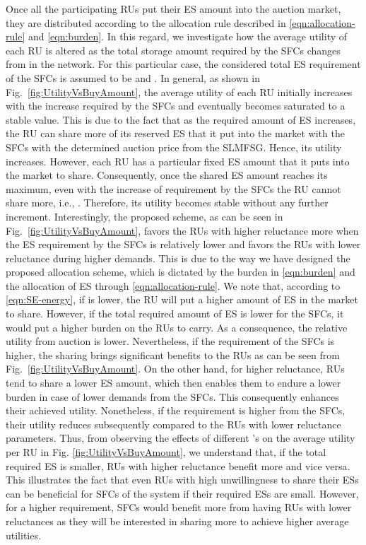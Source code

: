 \documentclass[journal,10pt]{IEEEtran}
\begin{document}
Once all the participating RUs put their ES amount into the auction market, they are distributed according to the allocation rule described in \eqref{eqn:allocation-rule} and \eqref{eqn:burden}. In this regard, we investigate how the average utility of each RU is altered as the total storage amount required by the SFCs changes from in the network. For this particular case, the considered total ES requirement of the SFCs is assumed to be  and . In general, as shown in Fig.~\ref{fig:UtilityVsBuyAmount}, the average utility of each RU initially increases with the increase required by the SFCs and eventually becomes saturated to a stable value. This is due to the fact that as the required amount of ES increases, the RU can share more of its reserved ES that it put into the market with the SFCs with the determined auction price from the SLMFSG. Hence, its utility increases. However, each RU has a particular fixed ES amount that it puts into the market to share. Consequently, once the shared  ES amount reaches its maximum, even with the increase of requirement by the SFCs the RU cannot share more, i.e., . Therefore, its utility becomes stable without any further increment. Interestingly, the proposed scheme, as can be seen in Fig.~\ref{fig:UtilityVsBuyAmount}, favors the RUs with higher reluctance more when the ES requirement by the SFCs is relatively lower and favors the RUs with lower reluctance during higher demands. This is due to the way we have designed the proposed allocation scheme, which is dictated by the burden in \eqref{eqn:burden} and the allocation of ES through \eqref{eqn:allocation-rule}. We note that, according to \eqref{eqn:SE-energy}, if  is lower, the RU  will put a higher amount of ES in the market to share. However, if the total required amount of ES is lower for the SFCs, it would put a higher burden on the RUs to carry. As a consequence, the relative utility from auction is lower. Nevertheless, if the requirement of the SFCs is higher, the sharing brings significant benefits to the RUs as can be seen from Fig.~\ref{fig:UtilityVsBuyAmount}. On the other hand, for higher reluctance, RUs tend to share a lower ES amount, which then enables them to endure a lower burden in case of lower demands from the SFCs. This consequently enhances their achieved utility. Nonetheless, if the requirement is higher from the SFCs, their utility reduces subsequently compared to the RUs with lower reluctance parameters. Thus, from observing the effects of different 's on the average utility per RU in Fig. \ref{fig:UtilityVsBuyAmount}, we understand that, if the total required ES is smaller, RUs with higher reluctance benefit more and vice versa. This illustrates the fact that even RUs with high unwillingness to share their ESs can be beneficial for SFCs of the system if their required ESs are small. However, for a higher requirement, SFCs would benefit more from having RUs with lower reluctances as they will be interested in sharing more to achieve higher average utilities.
\end{document}
